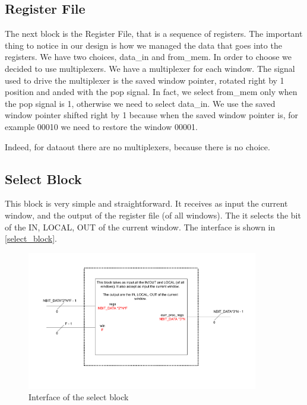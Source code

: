 \newpage

\subsection{Register File}

The next block is the Register File, that is a sequence of registers. The important thing to notice in our design is how we managed the data that goes into the registers. We have two choices, data\_in and from\_mem. In order to choose we decided to use multiplexers. 
We have a multiplexer for each window. The signal used to drive the multiplexer is the saved window pointer, rotated right by 1 position and anded with the pop signal. In fact, we select from\_mem only when the pop signal is 1, otherwise we need to select data\_in. 
We use the saved window pointer shifted right by 1 because when the saved window pointer is, for example 00010 we need to restore the window 00001. 

Indeed, for dataout there are no multiplexers, because there is no choice. 

\subsection{Select Block}

This block is very simple and straightforward. It receives as input the current window, and the output of the register file (of all windows). The it selects the bit of the IN, LOCAL, OUT of the current window. The interface is shown in \autoref{select_block}.

\begin{figure}[ht]
  \centering
  \includegraphics[width=0.9\textwidth]{chapters/4_DecodeStage/images/select_block.pdf}
  \caption{Interface of the select block}
  \label{select_block}
\end{figure}

